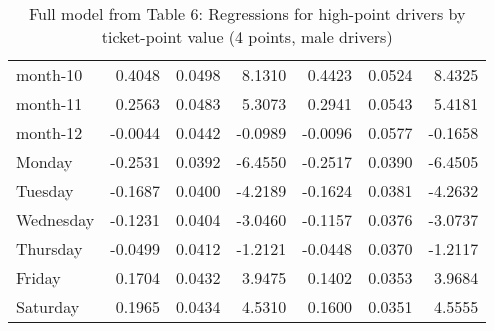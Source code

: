 \documentclass[10pt]{article}
\begin{document}
\begin{table}[ht]
\begin{tabular}{lrrrrrr}
  month-10 & 0.4048 & 0.0498 & 8.1310 & 0.4423 & 0.0524 & 8.4325 \\ 
  month-11 & 0.2563 & 0.0483 & 5.3073 & 0.2941 & 0.0543 & 5.4181 \\ 
  month-12 & -0.0044 & 0.0442 & -0.0989 & -0.0096 & 0.0577 & -0.1658 \\ 
  Monday & -0.2531 & 0.0392 & -6.4550 & -0.2517 & 0.0390 & -6.4505 \\ 
  Tuesday & -0.1687 & 0.0400 & -4.2189 & -0.1624 & 0.0381 & -4.2632 \\ 
  Wednesday & -0.1231 & 0.0404 & -3.0460 & -0.1157 & 0.0376 & -3.0737 \\ 
  Thursday & -0.0499 & 0.0412 & -1.2121 & -0.0448 & 0.0370 & -1.2117 \\ 
  Friday & 0.1704 & 0.0432 & 3.9475 & 0.1402 & 0.0353 & 3.9684 \\ 
  Saturday & 0.1965 & 0.0434 & 4.5310 & 0.1600 & 0.0351 & 4.5555 \\ 
   \hline
\end{tabular}
\caption{Full model from Table 6: Regressions for high-point drivers by ticket-point value (4 points, male drivers)} 
\label{tab_6_4_pts_no_age_M}
\end{table}


\clearpage
\pagebreak



\end{document}

